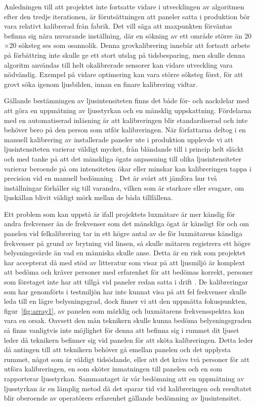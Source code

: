         Anledningen till att projektet inte fortsatte vidare i utvecklingen av algoritmen efter den tredje iterationen, är förutsättningen att paneler satta i produktion bör vara relativt kalibrerad från fabrik. Det vill säga att maxpunkten förväntas befinna sig nära nuvarande inställning, där en sökning av ett område större än 20$\times$20 söksteg ses som osannolik. Denna grovkalibrering innebär att fortsatt arbete på förbättring inte skulle ge ett stort utslag på tidsbesparing, men skulle denna algoritm användas till helt okalibrerade sensorer kan vidare utveckling vara nödvändig. Exempel på vidare optimering kan vara större söksteg först, för att grovt söka igenom ljusbilden, innan en finare kalibrering vidtar.\bigskip

        Gällande bestämningen av ljusintensiteten finns det både för- och nackdelar med att göra en uppmätning av ljusstyrkan och en mänsklig uppskattning. Fördelarna med en automatiserad inläsning är att kalibreringen blir standardiserad och inte behöver bero på den person som utför kalibreringen. När författarna deltog i en manuell kalibrering av installerade paneler ute i produktion upplevde vi att ljusintensiteten varierar väldigt mycket, från bländande till i princip helt släckt och med tanke på att det mänskliga ögats anpassning till olika ljusintensiteter varierar beroende på om intensiteten ökar eller minskar kan kalibreringen tappa i precision vid en manuell bedömning \cite[s.~273]{aot}. Det är svårt att jämföra hur två inställningar förhåller sig till varandra, vilken som är starkare eller svagare, om ljuskällan blivit väldigt mörk mellan de båda tillfällena.\bigskip 

        Ett problem som kan uppstå är ifall projektets luxmätare är mer känslig för andra frekvenser än de frekvenser som det mänskliga ögat är känsligt för och om panelen vid felkalibrering tar in ett högre antal av de för luxmätarens känsliga frekvenser på grund av brytning vid linsen, så skulle mätaren registrera ett högre belysningsvärde än vad en människa skulle anse. Detta är en risk som projektet har accepterat då med stöd av litteratur som visar på att ljusmiljö är komplext att bedöma och kräver personer med erfarenhet för att bedömas korrekt, personer som företaget inte har att tillgå vid paneler redan satta i drift \cite[s.~278]{aot}. De kalibreringar som har genomförts i testmiljön har inte kunnat visa på att fel frekvenser skulle leda till en lägre belysningsgrad, dock finner vi att den uppmätta fokuspunkten, figur~\ref{fig:array1}, av panelen som märklig och luxmätarens frekvensspektra kan vara en orsak. Oavsett den mån teknikern skulle kunna bedöma belysningsgraden så finns vanligtvis inte möjlighet för denna att befinna sig i rummet dit ljuset leder då teknikern befinner sig vid panelen för att sköta kalibreringen. Detta leder då antingen till att teknikern behöver gå emellan panelen och det upplysta rummet, något som är väldigt tidsödande, eller att det krävs två personer för att utföra kalibreringen, en som sköter inmatningen till panelen och en som rapporterar ljusstyrkan. Sammantaget är vår bedömning att en uppmätning av ljusstyrkan är en lämplig metod då det sparar tid vid kalibreringen och resultatet blir oberoende av operatörers erfarenhet gällande bedömning av ljusintensitet. \bigskip

